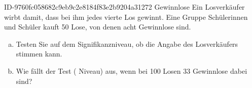 \begin{exercise}
      {ID-9760fc058682c9eb9c2e8184f83e2b9204a31272}
      {Gewinnlose}
  \ifproblem\problem
    Ein Losverkäufer wirbt damit, dass bei ihm jedes vierte Los gewinnt.
    Eine Gruppe Schülerinnen und Schüler kauft 50 Lose, von denen acht
    Gewinnlose sind.
    \begin{enumerate}[a)]
      \item Testen Sie auf dem  Signifikanzniveau, ob die Angabe des
            Losverkäufers stimmen kann.
      \item Wie fällt der Test ( Niveau) aus, wenn bei 100 Losen 33
            Gewinnlose dabei sind?
    \end{enumerate}
  \fi
\end{exercise}
